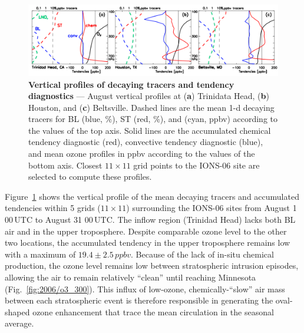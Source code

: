 	\begin{figure}[t!]
		\centering
		 \label{fig:2006/tendency_vertical} 
		\includegraphics[width=1.0\textwidth]{tendency/vertical.png}
		\caption[Vertical profiles of decaying tracers and tendency diagnostics]{\textbf{Vertical profiles of decaying tracers
		and tendency diagnostics} --- August vertical profiles at ({\bf a}) Trinidata Head, ({\bf b}) Houston,
		and ({\bf c}) Beltsville. Dashed lines are the mean 1-d decaying tracers for BL (blue, \unit{\%}), ST (red, \unit{\%}), and {\lnox} (cyan,
		\unit{ppbv}) according to the values of the top axis. Solid lines are the accumulated chemical tendency diagnostic (red), convective
		tendency diagnostic (blue), and mean ozone profiles in \unit{ppbv} according to the values of the bottom axis. Closest $11\times11$
		grid points to the IONS-06 site are selected to compute these profiles.}\vspace{-.3in}
	\end{figure}

Figure~\ref{fig:2006/tendency_vertical} shows the vertical profile of the mean decaying tracers and accumulated tendencies within 5 grids
($11\times11$) surrounding the IONS-06 sites from August 1 00\,\unit{UTC} to August 31 00\,\unit{UTC}. The inflow region (Trinidad Head)
lacks both BL air and {\lnox} in the upper troposphere. Despite comparable ozone level to the other two locations, the accumulated tendency in the upper
troposphere remains low with a maximum of $19.4\pm2.5\,\unit{ppbv}$. Because of the lack of in-situ chemical production, the ozone level remains
low between stratospheric intrusion episodes, allowing the air to remain relatively ``clean'' until reaching Minnesota (Fig.~\ref{fig:2006/o3_300}).
This influx of low-ozone, chemically-``slow'' air mass between each stratospheric event is therefore responsible in generating the oval-shaped
ozone enhancement that trace the mean circulation in the seasonal average.

